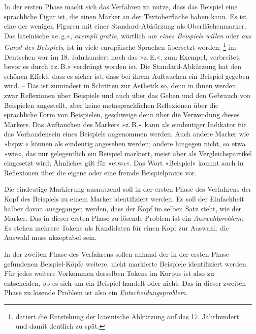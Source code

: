 \documentclass{article}
\newcommand*{\latein}{\textit}%
\renewcommand*{\see}{\autocap{v}gl\adddot}%
\begin{document}
In der ersten Phase macht sich das Verfahren zu nutze, dass das
Beispiel eine sprachliche Figur ist, die einen Marker an der
Textoberfläche haben kann. Es ist eine der wenigen Figuren mit einer
Standard-Abkürzung als Oberflächenmarker. Das lateinische »e.\,g.«,
\latein{exempli gratia}, wörtlich \emph{um eines Beispiels willen}
oder \emph{aus Gunst des Beispiels}, ist in viele europäische Sprachen
übersetzt worden;%
\footnote{\Textcite[118]{Cappelli1990a} datiert die Entstehung der
  lateinische Abkürzung auf das 17. Jahrhundert und damit deutlich zu
  spät.} %
im Deutschen war im 18. Jahrhundert noch das »z.\,E.«, zum Exempel,
verbreitet, bevor es durch »z.\,B.« verdrängt worden ist. %
Die Standard-Abkürzung hat den schönen Effekt, dass es sicher ist,
dass bei ihrem Auftauchen ein Beispiel gegeben wird. -- Das ist
zumindest in Schriften zur Ästhetik so, denn in ihnen werden zwar
Reflexionen über Beispiele und auch über das Geben und den Gebrauch
von Beispielen angestellt, aber keine metasprachlichen Reflexionen
über die sprachliche Form von Beispielen, geschweige denn über die
Verwendung dieses Markers. Das Auftauchen des Markers »z.\,B.« kann
als eindeutiger Indikator für das Vorhandensein eines Beispiels
angenommen werden. Auch andere Marker wie »bspw.« können als eindeutig
angesehen werden; andere hingegen nicht, so etwa »wie«, das nur
gelegentlich ein Beispiel markiert, meist aber als Vergleichspartikel
eingesetzt wird; Ähnliches gilt für »etwa«. Das Wort »Beispiel« kommt
auch in Reflexionen über die eigene oder eine fremde Beispielpraxis
vor.

Die eindeutige Markierung ausnutzend soll in der ersten Phase des
Verfahrens der Kopf des Beispiels zu einem Marker identifiziert
werden. Es soll der Einfachheit halber davon ausgegangen werden, dass
der Kopf im selben Satz steht, wie der Marker. Das in dieser ersten
Phase zu lösende Problem ist ein \emph{Auswahlproblem}: Es stehen
mehrere Tokens als Kandidaten für einen Kopf zur Auswahl; die Auswahl
muss akzeptabel sein.

In der zweiten Phase des Verfahrens sollen anhand der in der ersten
Phase gefundenen Beispiel-Köpfe weitere, nicht markierte Beispiele
identifiziert werden. Für jedes weitere Vorkommen derselben Tokens im
Korpus ist also zu entscheiden, ob es sich um ein Beispiel handelt
oder nicht. Das in dieser zweiten Phase zu lösende Problem ist also
ein \emph{Entscheidungsproblem}.
\end{document}
